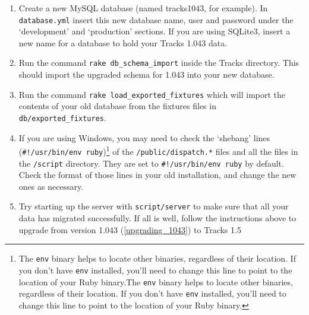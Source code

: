\documentclass[10pt,twoside]{memoir}
\def\mybibliostyle{plain}
\def\bibliocommand{}
\begin{document}
\begin{enumerate}
\item Create a new MySQL database (named tracks1043, for example). In \texttt{database.yml} insert this new database name, user and password under the `development' and `production' sections. If you are using SQLite3, insert a new name for a database to hold your Tracks 1.043 data.

\item Run the command \texttt{rake db\_schema\_import} inside the Tracks directory. This should import the upgraded schema for 1.043 into your new database.

\item Run the command \texttt{rake load\_exported\_fixtures} which will import the contents of your old database from the fixtures files in \texttt{db/exported\_fixtures}.

\item If you are using Windows, you may need to check the `shebang' lines (\texttt{\#!/usr/bin/env ruby})\footnote{The \texttt{env} binary helps to locate other binaries, regardless of their location. If you don't have \texttt{env} installed, you'll need to change this line to point to the location of your Ruby binary.The \texttt{env} binary helps to locate other binaries, regardless of their location. If you don't have \texttt{env} installed, you'll need to change this line to point to the location of your Ruby binary.} of the \texttt{/public/dispatch.*} files and all the files in the \texttt{/script} directory. They are set to \texttt{\#!/usr/bin/env ruby} by default. Check the format of those lines in your old installation, and change the new ones as necessary.

\item Try starting up the server with \texttt{script/server} to make sure that all your data has migrated successfully. If all is well, follow the instructions above to upgrade from version 1.043 (\autoref{upgrading_1043}) to Tracks 1.5
\end{enumerate}

%
%

\backmatter


\bibliocommand

\printglossary


\printindex
\end{document}
